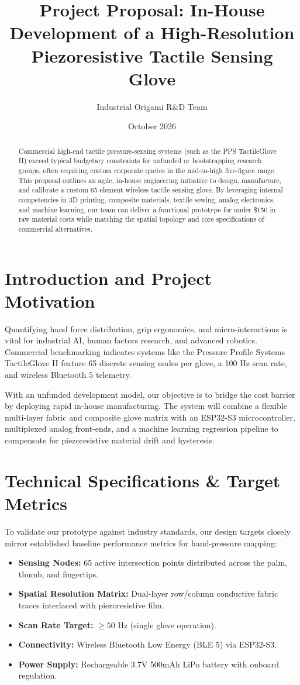 \documentclass[11pt,a4paper]{article}
\title{\textbf{Project Proposal: In-House Development of a High-Resolution Piezoresistive Tactile Sensing Glove}}
\author{Industrial Origami R\&D Team}
\date{October 2026}
\begin{document}
\maketitle

\begin{abstract}
Commercial high-end tactile pressure-sensing systems (such as the PPS TactileGlove II) exceed typical budgetary constraints for unfunded or bootstrapping research groups, often requiring custom corporate quotes in the mid-to-high five-figure range. This proposal outlines an agile, in-house engineering initiative to design, manufacture, and calibrate a custom 65-element wireless tactile sensing glove. By leveraging internal competencies in 3D printing, composite materials, textile sewing, analog electronics, and machine learning, our team can deliver a functional prototype for under \$150 in raw material costs while matching the spatial topology and core specifications of commercial alternatives.
\end{abstract}

\section{Introduction and Project Motivation}
Quantifying hand force distribution, grip ergonomics, and micro-interactions is vital for industrial AI, human factors research, and advanced robotics. Commercial benchmarking indicates systems like the Pressure Profile Systems TactileGlove II feature 65 discrete sensing nodes per glove, a 100 Hz scan rate, and wireless Bluetooth 5 telemetry. 

With an unfunded development model, our objective is to bridge the cost barrier by deploying rapid in-house manufacturing. The system will combine a flexible multi-layer fabric and composite glove matrix with an ESP32-S3 microcontroller, multiplexed analog front-ends, and a machine learning regression pipeline to compensate for piezoresistive material drift and hysteresis.

\section{Technical Specifications & Target Metrics}
To validate our prototype against industry standards, our design targets closely mirror established baseline performance metrics for hand-pressure mapping:
\begin{itemize}
    \item \textbf{Sensing Nodes:} 65 active intersection points distributed across the palm, thumb, and fingertips.
    \item \textbf{Spatial Resolution Matrix:} Dual-layer row/column conductive fabric traces interlaced with piezoresistive film.
    \item \textbf{Scan Rate Target:} $\ge 50\text{ Hz}$ (single glove operation).
    \item \textbf{Connectivity:} Wireless Bluetooth Low Energy (BLE 5) via ESP32-S3.
    \item \textbf{Power Supply:} Rechargeable 3.7V 500mAh LiPo battery with onboard regulation.
\end{itemize}
\end{document}
